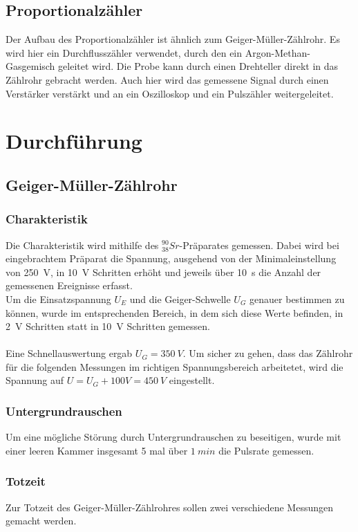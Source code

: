 \documentclass[12pt,a4paper]{article}
\begin{document}
\subsection{Proportionalzähler}
Der Aufbau des Proportionalzähler ist ähnlich zum Geiger-Müller-Zählrohr. Es wird hier ein Durchflusszähler verwendet, durch den ein Argon-Methan-Gasgemisch geleitet wird. Die Probe kann durch einen Drehteller direkt in das Zählrohr gebracht werden. Auch hier wird das gemessene Signal durch einen Verstärker verstärkt und an ein Oszilloskop und ein Pulszähler weitergeleitet.
\section{Durchführung}
\subsection{Geiger-Müller-Zählrohr}
\subsubsection{Charakteristik}
Die Charakteristik wird mithilfe des $_{38}^{90}Sr$-Präparates gemessen. Dabei wird bei eingebrachtem Präparat die Spannung, ausgehend von der Minimaleinstellung von \SI{250}{V}, in \SI{10}{V} Schritten erhöht und jeweils über \SI{10}{s} die Anzahl der gemessenen Ereignisse erfasst.\\
Um die Einsatzspannung $U_E$ und die Geiger-Schwelle $U_G$ genauer bestimmen zu können, wurde im entsprechenden Bereich, in dem sich diese Werte befinden, in \SI{2}{V} Schritten statt in \SI{10}{V} Schritten gemessen.\\
\\Eine Schnellauswertung ergab $U_G = \SI{350}{V}$. Um sicher zu gehen, dass das Zählrohr für die folgenden Messungen im richtigen Spannungsbereich arbeitetet, wird die Spannung auf $U = U_G + 100V = \SI{450}{V}$ eingestellt.

\subsubsection{Untergrundrauschen}
Um eine mögliche Störung durch Untergrundrauschen zu beseitigen, wurde mit einer leeren Kammer insgesamt 5 mal über $\SI{1}{min}$ die Pulsrate gemessen.

\subsubsection{Totzeit}
Zur Totzeit des Geiger-Müller-Zählrohres sollen zwei verschiedene Messungen gemacht werden.
\end{document}
